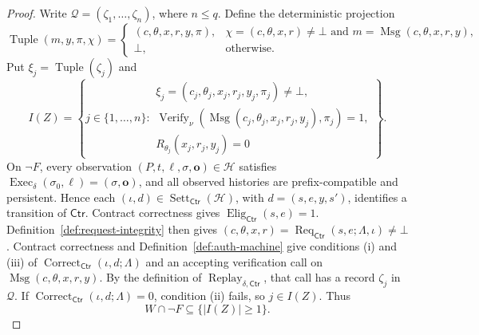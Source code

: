 \documentclass[10pt,letterpaper]{article}
\newcommand{\Verify}{\operatorname{Verify}}
\newcommand{\Msg}{\operatorname{Msg}}
\newcommand{\Ctr}{\mathsf{Ctr}}
\begin{document}
\begin{proof}
Write $\mathcal Q=(\zeta_1,\ldots,\zeta_n)$, where $n\leq q$. Define the deterministic projection
\[
 \operatorname{Tuple}(m,y,\pi,\chi)=
 \begin{cases}
 (c,\theta,x,r,y,\pi),&\chi=(c,\theta,x,r)\ne\bot
                 \text{ and }m=\Msg(c,\theta,x,r,y),\\
 \bot,&\text{otherwise}.
 \end{cases}
\]
Put $\xi_j=\operatorname{Tuple}(\zeta_j)$ and
\[
 I(Z)=\left\{j\in\{1,\ldots,n\}:
 \begin{array}{l}
 \xi_j=(c_j,\theta_j,x_j,r_j,y_j,\pi_j)\ne\bot,\\
 \Verify_\nu(\Msg(c_j,\theta_j,x_j,r_j,y_j),\pi_j)=1,\\
 R_{\theta_j}(x_j,r_j,y_j)=0
 \end{array}\right\}.
\]
On $\neg F$, every observation $(P,t,\ell,\sigma,\mathbf o)\in\mathcal H$ satisfies $\operatorname{Exec}_\delta(\sigma_0,\ell)=(\sigma,\mathbf o)$, and all observed histories are prefix-compatible and persistent. Hence each $(\iota,d)\in\operatorname{Sett}_{\Ctr}(\mathcal H)$, with $d=(s,e,y,s')$, identifies a transition of $\Ctr$. Contract correctness gives $\operatorname{Elig}_{\Ctr}(s,e)=1$. Definition~\ref{def:request-integrity} then gives $(c,\theta,x,r)=\operatorname{Req}_{\Ctr}(s,e;\Lambda,\iota)\ne\bot$. Contract correctness and Definition~\ref{def:auth-machine} give conditions (i) and (iii) of $\operatorname{Correct}_{\Ctr}(\iota,d;\Lambda)$ and an accepting verification call on $\Msg(c,\theta,x,r,y)$. By the definition of $\operatorname{Replay}_{\delta,\Ctr}$, that call has a record $\zeta_j$ in $\mathcal Q$. If $\operatorname{Correct}_{\Ctr}(\iota,d;\Lambda)=0$, condition (ii) fails, so $j\in I(Z)$. Thus
\[
 W\cap\neg F\subseteq\{|I(Z)|\geq1\}.
\]


\end{proof}
\end{document}
